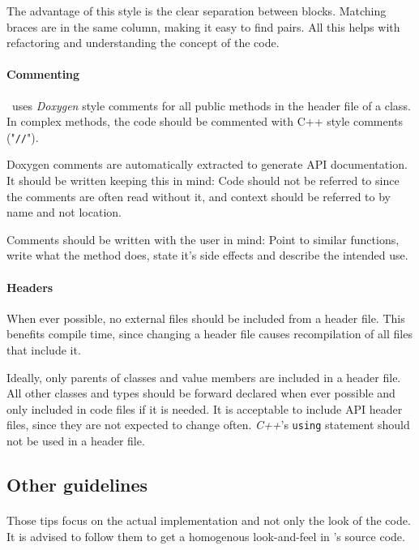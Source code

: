 The advantage of this style is the clear separation between blocks.
Matching braces are in the same column, making it easy to find pairs.
All this helps with refactoring and understanding the concept of the code.


\paragraph{Commenting}
\ER\ uses \textit{Doxygen} style comments for all public methods in the header file of a class.
In complex methods, the code should be commented with C++ style comments ("\texttt{//}").

Doxygen comments are automatically extracted to generate API documentation.
It should be written keeping this in mind:
Code should not be referred to since the comments are often read without it, and context should be referred to by name and not location.

Comments should be written with the user in mind:
Point to similar functions, write what the method does, state it's side effects and describe the intended use.


\paragraph{Headers}
When ever possible, no external files should be included from a header file.
This benefits compile time, since changing a header file causes recompilation of all files that include it.

Ideally, only parents of classes and value members are included in a header file.
All other classes and types should be forward declared when ever possible and only included in code files if it is needed.
It is acceptable to include API header files, since they are not expected to change often.
\textit{C++}'s \texttt{using} statement should not be used in a header file.

\subsection{Other guidelines}
\paragraph{}
Those tips focus on the actual implementation and not only the look of the code.
It is advised to follow them to get a homogenous look-and-feel in \ER's source code.


